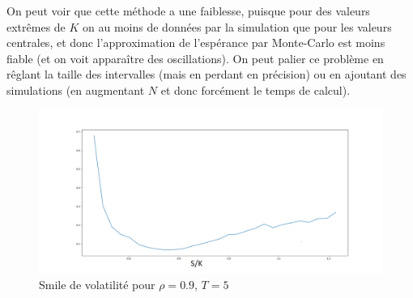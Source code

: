 \documentclass{report}
\begin{document}
On peut voir que cette méthode a une faiblesse, puisque pour des valeurs extrêmes de $K$ on au moins de données par la simulation que pour les valeurs centrales, et donc l'approximation de l'espérance par Monte-Carlo est moins fiable (et on voit apparaître des oscillations). On peut palier ce problème en rêglant la taille des intervalles (mais en perdant en précision) ou en ajoutant des simulations (en augmentant $N$ et donc forcément le temps de calcul).

\begin{figure}[H]
\begin{center}
\includegraphics[scale=0.3]{smile02.png}
\end{center}
\caption{Smile de volatilité pour $\rho = 0.9$, $T = 5$}
\end{figure} 
\newpage
\end{document}
